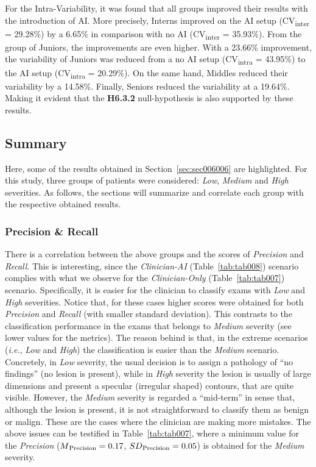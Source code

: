 For the Intra-Variability, it was found that all groups improved their results with the introduction of \ac{AI}.
More precisely, Interns improved on the \ac{AI} setup (CV\textsubscript{inter} = 29.28\%) by a 6.65\% in comparison with no \ac{AI} (CV\textsubscript{inter} = 35.93\%).
From the group of Juniors, the improvements are even higher.
With a 23.66\% improvement, the variability of Juniors was reduced from a no \ac{AI} setup (CV\textsubscript{intra} = 43.95\%) to the \ac{AI} setup (CV\textsubscript{intra} = 20.29\%).
On the same hand, Middles reduced their variability by a 14.58\%.
Finally, Seniors reduced the variability at a 19.64\%.
Making it evident that the {\bf H6.3.2} null-hypothesis is also supported by these results.

\subsection{Summary}
\label{sec:sec006006004}

Here, some of the results obtained in Section~\ref{sec:sec006006} are highlighted.
For this study, three groups of patients were considered: {\it Low}, {\it Medium} and {\it High} severities.
As follows, the sections will summarize and correlate each group with the respective obtained results.

\subsubsection{Precision \& Recall}
\label{sec:sec006006004001}

There is a correlation between the above groups and the scores of {\it Precision} and {\it Recall}.
This is interesting, since the {\it Clinician-AI} (Table~\ref{tab:tab008}) scenario complies with what we observe for the {\it Clinician-Only} (Table~\ref{tab:tab007}) scenario.
Specifically, it is easier for the clinician to classify exams with {\it Low} and {\it High} severities. Notice that, for these cases higher scores were obtained for both {\it Precision} and {\it Recall} (with smaller standard deviation).
This contrasts to the classification performance in the exams that belongs to {\it Medium} severity (see lower values for the metrics).
The reason behind is that, in the  extreme scenarios ({\it i.e.}, {\it Low} and {\it High}) the classification is easier than the {\it Medium} scenario.
Concretely, in {\it Low} severity, the usual decision is to assign a pathology of ``no findings'' (no lesion is present), while in {\it High} severity the lesion is usually of large dimensions and present a specular (irregular shaped) contours, that are quite visible.
However, the {\it Medium} severity is regarded a ``mid-term'' in sense that, although the lesion is present, it is not straightforward to classify them as benign or malign.
These are the cases where the clinician are making more mistakes.
The above issues can be testified in Table~\ref{tab:tab007}, where a minimum value for the {\it Precision} ($M\textsubscript{Precision} = 0.17$, $SD\textsubscript{Precision} = 0.05$) is obtained for the {\it Medium} severity.

